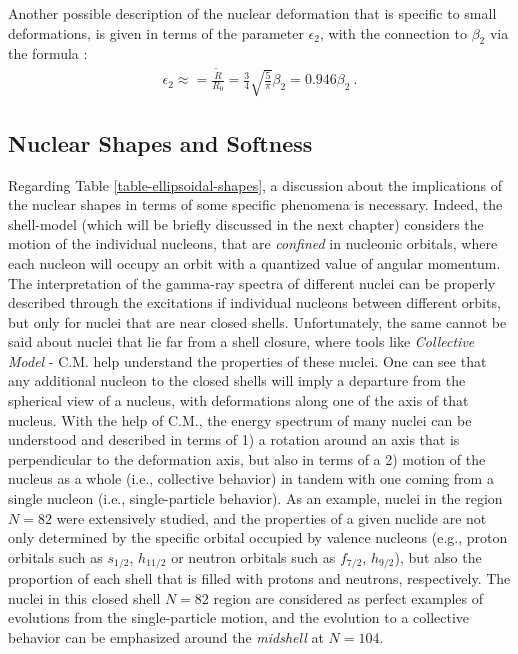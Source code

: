 Another possible description of the nuclear deformation that is specific to small deformations, is given in terms of the parameter $\epsilon_2$, with the connection to $\beta_2$ via the formula \cite{casten2000nuclear}:
\begin{align}
    \epsilon_2\approx=\frac{\tilde{R}}{R_0}=\frac{3}{4}\sqrt{\frac{5}{\pi}}\beta_2=0.946\beta_2\ .
    \label{epsilon-beta-relation}
\end{align}

\subsection{Nuclear Shapes and Softness}

Regarding Table \ref{table-ellipsoidal-shapes}, a discussion about the implications of the nuclear shapes in terms of some specific phenomena is necessary. Indeed, the shell-model (which will be briefly discussed in the next chapter) considers the motion of the individual nucleons, that are \emph{confined} in nucleonic orbitals, where each nucleon will occupy an orbit with a quantized value of angular momentum. The interpretation of the gamma-ray spectra of different nuclei can be properly described through the excitations if individual nucleons between different orbits, but only for nuclei that are near closed shells. 
Unfortunately, the same cannot be said about nuclei that lie far from a shell closure, where tools like \emph{Collective Model} - C.M. \cite{bohr1998nuclear} help understand the properties of these nuclei. One can see that any additional nucleon to the closed shells will imply a departure from the spherical view of a nucleus, with deformations along one of the axis of that nucleus. With the help of C.M., the energy spectrum of many nuclei can be understood and described in terms of 1) a rotation around an axis that is perpendicular to the deformation axis, but also in terms of a 2) motion of the nucleus as a whole (i.e., collective behavior) in tandem with one coming from a single nucleon (i.e., single-particle behavior).
As an example, nuclei in the region $N=82$ were extensively studied, and the properties of a given nuclide are not only determined by the specific orbital occupied by valence nucleons (e.g., proton orbitals such as $s_{1/2}$, $h_{11/2}$ or neutron orbitals such as $f_{7/2}$, $h_{9/2}$), but also the proportion of each shell that is filled with protons and neutrons, respectively. The nuclei in this closed shell $N=82$ region are considered as perfect examples of evolutions from the single-particle motion, and the evolution to a collective behavior can be emphasized around the \emph{midshell} at $N=104$. 

